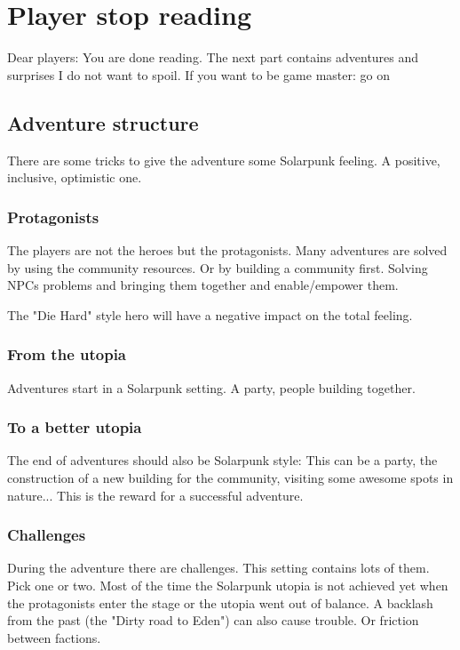 \chapter{Player stop reading}

Dear players: You are done reading. The next part contains adventures and surprises I do not want to spoil. If you want to be game master: go on


\section{Adventure structure}

There are some tricks to give the adventure some Solarpunk feeling. A positive, inclusive, optimistic one.

\subsection{Protagonists}

The players are not the heroes but the protagonists. Many adventures are solved by using the community resources.
Or by building a community first. Solving NPCs problems and bringing them together and enable/empower them.

The "Die Hard" style hero will have a negative impact on the total feeling.

\subsection{From the utopia}

Adventures start in a Solarpunk setting. A party, people building together.

\subsection{To a better utopia}

The end of adventures should also be Solarpunk style: This can be a party, the construction of a new building for the community, visiting some awesome spots in nature... This is the reward for a successful adventure.

\subsection{Challenges}

During the adventure there are challenges. This setting contains lots of them. Pick one or two. Most of the time the Solarpunk utopia is not achieved yet when the protagonists enter the stage or the utopia went out of balance. A backlash from the past (the "Dirty road to Eden") can also cause trouble. Or friction between factions.

